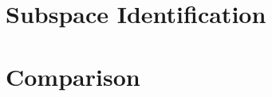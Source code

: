 \documentclass[11pt, oneside,a4paper,fleqn]{report}
\begin{document}
\chapter{\bf Subspace Identification}





\chapter{\bf Comparison}

 

\end{document}

